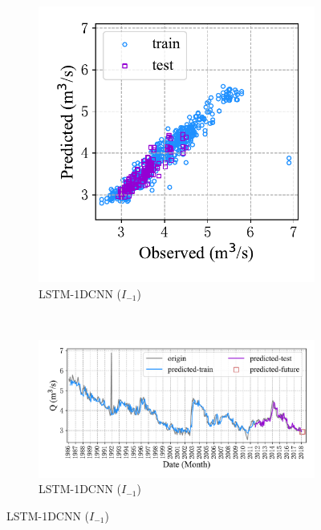 \begin{figure}[!htbp]
\centering
  \begin{subfigure}[b]{0.305\textwidth}
    \includegraphics[width=\textwidth]{Img/chap4_spr/out2/spr_scatter_in_1_out_2_lstm_cnn.pdf}
    \vspace{-1.2cm}
    \caption{LSTM-1DCNN ($I_{-1}$)}
    \label{fig:spr_scatter_in_1_out_2_lstm_cnn}
  \end{subfigure}
  ~
  \begin{subfigure}[b]{0.615\textwidth}
    \includegraphics[width=\textwidth]{Img/chap4_spr/out2/spr_series_in_1_out_2_lstm_cnn.pdf}
    \vspace{-1.2cm}
    \caption{LSTM-1DCNN ($I_{-1}$)}
    \label{fig:spr_series_in_1_out_2_lstm_cnn}

\end{subfigure}
\end{figure}
